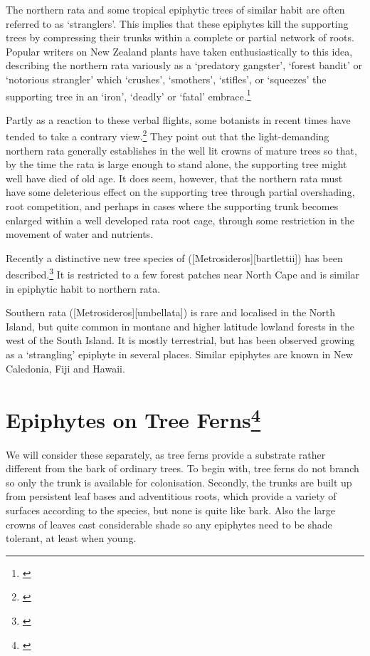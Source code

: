 The northern rata and some tropical epiphytic trees of similar habit are often referred to as `stranglers'.
This implies that these epiphytes kill the supporting trees by compressing their trunks within a complete or partial network of roots.
Popular writers on New Zealand plants have taken enthusiastically to this idea, describing the northern rata variously as a `predatory gangster', `forest bandit' or `notorious strangler' which `crushes', `smothers', `stifles', or `squeezes' the supporting tree in an `iron', `deadly' or `fatal' embrace.\footnote{\cite{druce1971uncle}}

Partly as a reaction to these verbal flights, some botanists in recent times have tended to take a contrary view.\footnote{\cite{zotov1948rata}}
They point out that the light-demanding northern rata generally establishes in the well lit crowns of mature trees so that, by the time the rata is large enough to stand alone, the supporting tree might well have died of old age.
It does seem, however, that the northern rata must have some deleterious effect on the supporting tree through partial overshading, root competition, and perhaps in cases where the supporting trunk becomes enlarged within a well developed rata root cage, through some restriction in the movement of water and nutrients.

Recently a distinctive new tree species of  ([Metrosideros][bartlettii]) has been described.\footnote{\cite{dawson1985metrosideros}}
It is restricted to a few forest patches near North Cape and is similar in epiphytic habit to northern rata.

Southern rata ([Metrosideros][umbellata]) is rare and localised in the North Island, but quite common in montane and higher latitude lowland forests in the west of the South Island.
It is mostly terrestrial, but has been observed growing as a `strangling' epiphyte in several places.
Similar  epiphytes are known in New Caledonia, Fiji and Hawai{\okina}i.

\section[Epiphytes on Tree Ferns]{Epiphytes on Tree Ferns\thinspace\footnote{\cite{pope1924role}}}

We will consider these separately, as tree ferns provide a substrate rather different from the bark of ordinary trees.
To begin with, tree ferns do not branch so only the trunk is available for colonisation.
Secondly, the trunks are built up from persistent leaf bases and adventitious roots, which provide a variety of surfaces according to the species, but none is quite like bark.
Also the large crowns of leaves cast considerable shade so any epiphytes need to be shade tolerant, at least when young.

